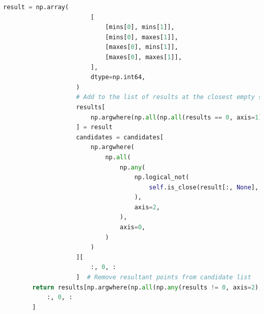 \documentclass{report}
\begin{document}
\begin{lstlisting}[language=python, caption={The \texttt{group_points} algorithm used in object detection}]
                    result = np.array(
                        [
                            [mins[0], mins[1]],
                            [mins[0], maxes[1]],
                            [maxes[0], mins[1]],
                            [maxes[0], maxes[1]],
                        ],
                        dtype=np.int64,
                    )
                    # Add to the list of results at the closest empty slot
                    results[
                        np.argwhere(np.all(np.all(results == 0, axis=1), axis=1))[0]
                    ] = result
                    candidates = candidates[
                        np.argwhere(
                            np.all(
                                np.any(
                                    np.logical_not(
                                        self.is_close(result[:, None], candidates)
                                    ),
                                    axis=2,
                                ),
                                axis=0,
                            )
                        )
                    ][
                        :, 0, :
                    ]  # Remove resultant points from candidate list
        return results[np.argwhere(np.all(np.any(results != 0, axis=2), axis=1))][
            :, 0, :
        ]
\end{lstlisting}
\end{document}
